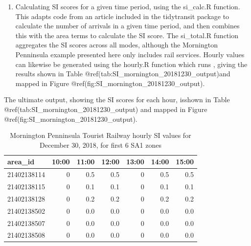 \documentclass[preprint, 3p,
authoryear]{elsarticle} %
\providecommand{\tightlist}{%
  \setlength{\itemsep}{0pt}\setlength{\parskip}{0pt}}
\begin{document}
\begin{enumerate}
\def\labelenumi{(\arabic{enumi})}
\setcounter{enumi}{3}
\tightlist
\item
  Calculating SI scores for a given time period, using the si\_calc.R
  function. This adapts code from an article included in the tidytransit
  package \citep{tidytransit_departure_timetable} to calculate the
  number of arrivals in a given time period, and then combines this with
  the area terms to calculate the SI score. The si\_total.R function
  aggregates the SI scores across all modes, although the Mornington
  Penninsula example presented here only includes rail services. Hourly
  values can likewise be generated using the hourly.R function which
  runs , giving the results shown in Table
  @ref(tab:SI\_mornington\_20181230\_output)and mapped in Figure
  @ref(fig:SI\_mornington\_20181230\_output).
\end{enumerate}

The ultimate output, showing the SI scores for each hour, isshown in
Table @ref(tab:SI\_mornington\_20181230\_output) and mapped in Figure
@ref(fig:SI\_mornington\_20181230\_output).

\begin{table}

\caption{\label{tab:SI_mornington_20181230_output}Mornington Penninsula Tourist Railway hourly SI values for December 30, 2018, for first 6 SA1 zones}
\centering
\begin{tabular}[t]{l|r|r|r|r|r|r}
\hline
area\_id & 10:00 & 11:00 & 12:00 & 13:00 & 14:00 & 15:00\\
\hline
21402138114 & 0 & 0.5 & 0.5 & 0 & 0.5 & 0.5\\
\hline
21402138115 & 0 & 0.1 & 0.1 & 0 & 0.1 & 0.1\\
\hline
21402138128 & 0 & 0.2 & 0.2 & 0 & 0.2 & 0.2\\
\hline
21402138502 & 0 & 0.0 & 0.0 & 0 & 0.0 & 0.0\\
\hline
21402138507 & 0 & 0.0 & 0.0 & 0 & 0.0 & 0.0\\
\hline
21402138508 & 0 & 0.0 & 0.0 & 0 & 0.0 & 0.0\\
\hline
\end{tabular}
\end{table}
\end{document}
